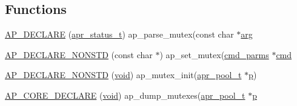 \subsection*{Functions}
\begin{DoxyCompactItemize}
\item 
\hyperlink{group__APACHE__CORE__MUTEX_ga354bb6f9a53786fa1259e061ced592e2}{A\+P\+\_\+\+D\+E\+C\+L\+A\+RE} (\hyperlink{group__apr__errno_gaa5105fa83cc322f09382292db8b47593}{apr\+\_\+status\+\_\+t}) ap\+\_\+parse\+\_\+mutex(const char $\ast$\hyperlink{group__APACHE__CORE__MUTEX_gaf6517210150d97cd5cb8a17e3768770d}{arg}
\item 
\hyperlink{group__APACHE__CORE__MUTEX_ga73e1ea8a00edfc035e97c44c3065df25}{A\+P\+\_\+\+D\+E\+C\+L\+A\+R\+E\+\_\+\+N\+O\+N\+S\+TD} (const char $\ast$) ap\+\_\+set\+\_\+mutex(\hyperlink{group__APACHE__CORE__CONFIG_ga1791fbd28d06a9847bad001541c5241e}{cmd\+\_\+parms} $\ast$\hyperlink{group__apr__thread__proc_ga7b715f5a87a71c6766684c1798251237}{cmd}
\item 
\hyperlink{group__APACHE__CORE__MUTEX_ga8171cd49a25e2f0dfc927b1381b23609}{A\+P\+\_\+\+D\+E\+C\+L\+A\+R\+E\+\_\+\+N\+O\+N\+S\+TD} (\hyperlink{group__MOD__ISAPI_gacd6cdbf73df3d9eed42fa493d9b621a6}{void}) ap\+\_\+mutex\+\_\+init(\hyperlink{structapr__pool__t}{apr\+\_\+pool\+\_\+t} $\ast$\hyperlink{group__APACHE__CORE__MPM_ga5cd91701e5c167f2b1a38e70ab57817e}{p})
\item 
\hyperlink{group__APACHE__CORE__MUTEX_ga92e9b5c4b76b1573b730f70307b5b691}{A\+P\+\_\+\+C\+O\+R\+E\+\_\+\+D\+E\+C\+L\+A\+RE} (\hyperlink{group__MOD__ISAPI_gacd6cdbf73df3d9eed42fa493d9b621a6}{void}) ap\+\_\+dump\+\_\+mutexes(\hyperlink{structapr__pool__t}{apr\+\_\+pool\+\_\+t} $\ast$\hyperlink{group__APACHE__CORE__MPM_ga5cd91701e5c167f2b1a38e70ab57817e}{p}
\end{DoxyCompactItemize}
